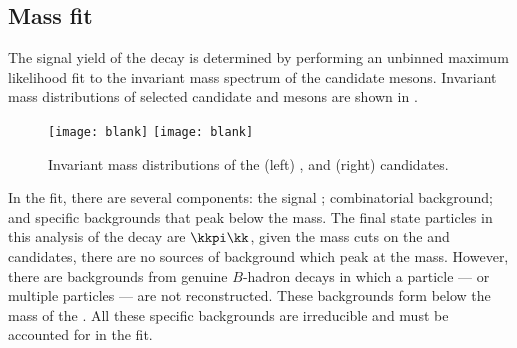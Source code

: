 \subsection{Mass fit}
\label{sec:dsphi:fit}
The signal yield of the decay \btodsphi is determined by performing an unbinned maximum likelihood
fit to the invariant mass spectrum of the candidate \Bp mesons.
Invariant mass distributions of
selected candidate \Ds and \phii mesons are shown in .

\begin{figure}
  \begin{center}
    \texttt{[image: blank]}
    \texttt{[image: blank]}
    \caption{\small
      Invariant mass distributions of the
      (left) \Ds, and
      (right) \phii candidates.
    }
    \label{fig:dsphi:mesons}
  \end{center}
\end{figure}


In the fit, there are several components: the signal \btodsphi; combinatorial background; and
specific backgrounds that peak below the \Bp mass.
The final state particles in this analysis of the decay \btodsphi are $\kkpi\kk$, given the mass
cuts on the \Ds and \phii candidates, there are no sources of background which peak at the \Bp
mass.
However, there are backgrounds from genuine $B$-hadron decays in which a particle --- or multiple
particles --- are not reconstructed.
These backgrounds form below the mass of the \Bp.
All these specific backgrounds are irreducible and must be accounted for in the fit.


